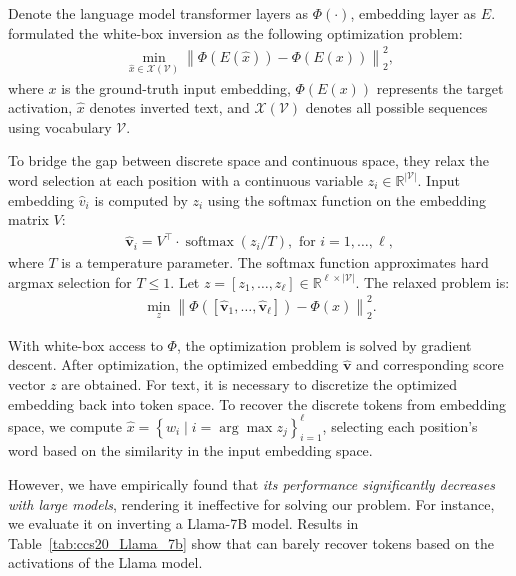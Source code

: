 Denote the language model transformer layers as $\Phi(\cdot)$, embedding layer as $E$. \cite{song2020information} formulated the white-box inversion as the following optimization problem:
\begin{align}
\label{eq:song_formulate}
\min _{\hat{x} \in \mathcal{X}(\mathcal{V})}\left\|\Phi(E(\hat{x}))-\Phi(E(x))\right\|_2^2,
\end{align}
 where $x$ is the ground-truth input embedding, $\Phi(E(x))$ represents the target activation, $\hat{x}$ denotes inverted text, and $\mathcal{X}(\mathcal{V})$ denotes all possible sequences using vocabulary $\mathcal{V}$.

To bridge the gap between discrete space and continuous space, they relax the word selection at each position  with a continuous variable $z_i \in \mathbb{R}^{|\mathcal{V}|}$.  Input embedding  $\hat{v}_i$ is computed by $z_i$ using the softmax function on the embedding matrix $V$:
\begin{align}
\label{eq:softmax_attn}
\hat{\boldsymbol{v}}_i=V^{\top} \cdot \operatorname{softmax}\left(z_i / T\right), \text { for } i=1, \ldots, \ell,
\end{align}
where $T$ is a temperature parameter. The softmax function approximates hard argmax selection for $T\le1$. Let $z=\left[z_1, \ldots, z_{\ell}\right] \in \mathbb{R}^{\ell \times|\mathcal{V}|}$. The relaxed problem is:
\begin{align}
\label{eq:relaxed_problem}
\min _z\left\|\Phi([\hat{\boldsymbol{v}}_1, \ldots, \hat{\boldsymbol{v}}_{\ell}])-\Phi(x)\right\|_2^2.
\end{align}

With white-box access to $\Phi$, the optimization problem is solved by gradient descent. After optimization, the optimized embedding $\hat{\boldsymbol{v}}$ and corresponding score vector $z$ are obtained. For text, it is necessary to discretize the optimized embedding back into token space. To recover the discrete tokens from embedding space, we compute $\hat{x}=\left\{w_i \mid i=\arg \max z_j\right\}_{i=1}^{\ell}$, selecting each position's word based on the similarity in the input embedding space.


However, we have empirically found that \emph{its performance significantly decreases with large models}, rendering it ineffective for solving our problem.  %
For instance, we evaluate it on inverting a Llama-7B model. Results in Table~\ref{tab:ccs20_Llama_7b} show that \cite{song2020information} can barely recover tokens based on the activations of the Llama model. 




